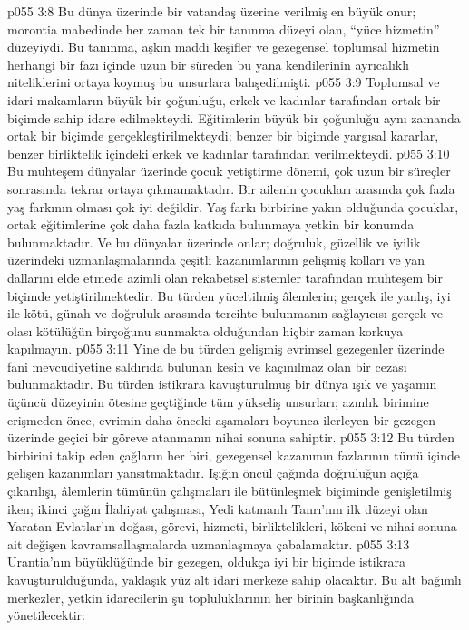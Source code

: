 \vs p055 3:8 Bu dünya üzerinde bir vatandaş üzerine verilmiş en büyük onur; morontia mabedinde her zaman tek bir tanınma düzeyi olan, “yüce hizmetin” düzeyiydi. Bu tanınma, aşkın maddi keşifler ve gezegensel toplumsal hizmetin herhangi bir fazı içinde uzun bir süreden bu yana kendilerinin ayrıcalıklı niteliklerini ortaya koymuş bu unsurlara bahşedilmişti.
\vs p055 3:9 Toplumsal ve idari makamların büyük bir çoğunluğu, erkek ve kadınlar tarafından ortak bir biçimde sahip idare edilmekteydi. Eğitimlerin büyük bir çoğunluğu aynı zamanda ortak bir biçimde gerçekleştirilmekteydi; benzer bir biçimde yargısal kararlar, benzer birliktelik içindeki erkek ve kadınlar tarafından verilmekteydi.
\vs p055 3:10 Bu muhteşem dünyalar üzerinde çocuk yetiştirme dönemi, çok uzun bir süreçler sonrasında tekrar ortaya çıkmamaktadır. Bir ailenin çocukları arasında çok fazla yaş farkının olması çok iyi değildir. Yaş farkı birbirine yakın olduğunda çocuklar, ortak eğitimlerine çok daha fazla katkıda bulunmaya yetkin bir konumda bulunmaktadır. Ve bu dünyalar üzerinde onlar; doğruluk, güzellik ve iyilik üzerindeki uzmanlaşmalarında çeşitli kazanımlarının gelişmiş kolları ve yan dallarını elde etmede azimli olan rekabetsel sistemler tarafından muhteşem bir biçimde yetiştirilmektedir. Bu türden yüceltilmiş âlemlerin; gerçek ile yanlış, iyi ile kötü, günah ve doğruluk arasında tercihte bulunmanın sağlayıcısı gerçek ve olası kötülüğün birçoğunu sunmakta olduğundan hiçbir zaman korkuya kapılmayın.
\vs p055 3:11 Yine de bu türden gelişmiş evrimsel gezegenler üzerinde fani mevcudiyetine saldırıda bulunan kesin ve kaçınılmaz olan bir cezası bulunmaktadır. Bu türden istikrara kavuşturulmuş bir dünya ışık ve yaşamın üçüncü düzeyinin ötesine geçtiğinde tüm yükseliş unsurları; azınlık birimine erişmeden önce, evrimin daha önceki aşamaları boyunca ilerleyen bir gezegen üzerinde geçici bir göreve atanmanın nihai sonuna sahiptir.
\vs p055 3:12 Bu türden birbirini takip eden çağların her biri, gezegensel kazanımın fazlarının tümü içinde gelişen kazanımları yansıtmaktadır. Işığın öncül çağında doğruluğun açığa çıkarılışı, âlemlerin tümünün çalışmaları ile bütünleşmek biçiminde genişletilmiş iken; ikinci çağın İlahiyat çalışması, Yedi katmanlı Tanrı’nın ilk düzeyi olan Yaratan Evlatlar’ın doğası, görevi, hizmeti, birliktelikleri, kökeni ve nihai sonuna ait değişen kavramsallaşmalarda uzmanlaşmaya çabalamaktır.
\vs p055 3:13 Urantia’nın büyüklüğünde bir gezegen, oldukça iyi bir biçimde istikrara kavuşturulduğunda, yaklaşık yüz alt idari merkeze sahip olacaktır. Bu alt bağımlı merkezler, yetkin idarecilerin şu topluluklarının her birinin başkanlığında yönetilecektir:
